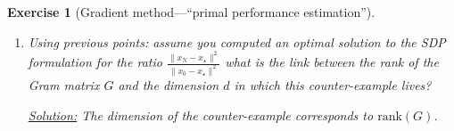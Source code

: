 \documentclass[11pt,a4paper]{article}
\newcommand{\correction}[1]{{{\color{blue}\underline{Solution:} #1}}}
\newcommand{\correction}[1]{}
\newtheorem{exercise}{Exercise}
\begin{document}
\begin{exercise}[Gradient method---``primal performance estimation'']
\begin{enumerate}
	\correction{ Following the same steps, we arrive to \begin{equation*}
		\begin{aligned}
		\sup_{\substack{d\\x_0,x_1,\ldots,x_{N},x_\star\\g_0,g_{1},\ldots,g_{N-1},g_\star\\f_k,f_{k+1},f_\star}} \quad & \|x_N-x_\star\|^2\\
		\text{s.t. } & \exists f\in\mathcal{F}_{\mu,L} \text{ such that }\left\{\begin{array}{ll}
			f_i=f(x_i)\quad & i=0,1,\ldots,N-1,\star\\
			g_i=\nabla f(x_i)\quad & i=0,1,\ldots,N-1,\star
			\end{array}\right.\\
		& x_{i+1}=x_i-\gamma_i  g_i \quad i=0,1,\ldots,N-1\\
		& \|x_0-x_\star\|^2= 1\\
		& g_\star=0.\\
		\end{aligned}
		\end{equation*}
	This formulation naturally translates to a $(N+1)\times (N+1)$ SDP with
			\begin{align*}
			P &\triangleq [x_0-x_\star,\, g_0,\, g_1,\,\ldots,\,g_{N-1}],\, G \triangleq P^{\top\!}P\succcurlyeq0,\\ F &\triangleq 			[f_0-f_\star,\, f_{1}-f_\star,\, f_{N-1}-f_\star].
			\end{align*}
	along with $N(N+1)$ interpolation inequalities (two inequalities per pair of points in the discrete representation). As a validation test for your code, using any constant stepsize rule $\gamma_k=\gamma$ should lead to a worst-case ratio equal to $ \left(\max\{(1-\gamma_k L)^2,(1-\gamma_k\mu)^2\}\right)^n$}
	
	\item Using previous points: assume you computed an optimal solution to the SDP formulation for the ratio $\frac{\|x_{N}-x_\star\|^2}{\|x_0-x_\star\|^2}$ what is the link between the rank of the Gram matrix $G$ and the dimension $d$ in which this counter-example lives? 
	
	\correction{The dimension of the counter-example corresponds to $\mathrm{rank}(G)$.}
	

\end{enumerate}
\end{exercise}
\end{document}
